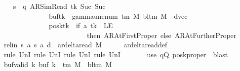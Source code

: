 \begin{isabellebody}
\ \ \isamarkupfalse%
\ {\isacharquery}{\kern0pt}s{\isacharprime}{\kern0pt}\ {\isacharequal}{\kern0pt}\ {\isachardoublequoteopen}{\isacharparenleft}{\kern0pt}q{\isacharcomma}{\kern0pt}\ AR{\isacharunderscore}{\kern0pt}SimRead{\isacharcomma}{\kern0pt}\ tk{\isacharcomma}{\kern0pt}\ Suc\ {\isacharparenleft}{\kern0pt}Suc\ {}{\isacharparenright}{\kern0pt}{\isacharcomma}{\kern0pt}\isanewline
\ \ \ \ \ \ \ \ \ \ \ \ \ \ buf{\isacharparenleft}{\kern0pt}tk\ {\isacharcolon}{\kern0pt}{\isacharequal}{\kern0pt}\ gamma{\isacharunderscore}{\kern0pt}unenum\ {\isacharparenleft}{\kern0pt}{\isasymGamma}{\isacharunderscore}{\kern0pt}tm\ M{\isacharparenright}{\kern0pt}\ {\isacharparenleft}{\kern0pt}bl{\isacharunderscore}{\kern0pt}tm\ M{\isacharparenright}{\kern0pt}\ {}{\isacharparenright}{\kern0pt}{\isacharcomma}{\kern0pt}\ dvec{\isacharcomma}{\kern0pt}\isanewline
\ \ \ \ \ \ \ \ \ \ \ \ \ \ posk{\isacharparenleft}{\kern0pt}tk\ {\isacharcolon}{\kern0pt}{\isacharequal}{\kern0pt}\ if\ {\isacharquery}{\kern0pt}a\ tk\ {\isacharequal}{\kern0pt}\ LE{}\isanewline
\ \ \ \ \ \ \ \ \ \ \ \ \ \ \ \ \ \ \ \ \ \ \ \ \ then\ AR{\isacharunderscore}{\kern0pt}AtFirstProper\ else\ AR{\isacharunderscore}{\kern0pt}AtFurtherProper{\isacharparenright}{\kern0pt}{\isacharparenright}{\kern0pt}{\isachardoublequoteclose}\isanewline
\ \ \isamarkupfalse%
\ rel{\isacharunderscore}{\kern0pt}in{\isacharcolon}{\kern0pt}\ {\isachardoublequoteopen}{\isacharparenleft}{\kern0pt}{\isacharquery}{\kern0pt}s{\isacharcomma}{\kern0pt}\ {\isacharquery}{\kern0pt}a{\isacharcomma}{\kern0pt}\ {\isacharquery}{\kern0pt}s{\isacharprime}{\kern0pt}{\isacharcomma}{\kern0pt}\ {\isacharquery}{\kern0pt}a{\isacharcomma}{\kern0pt}\ {\isacharquery}{\kern0pt}d{\isacharparenright}{\kern0pt}\ {\isasymin}\ ar{\isacharunderscore}{\kern0pt}delta{\isacharunderscore}{\kern0pt}read\ M{\isachardoublequoteclose}\isanewline
\ \ \ \ \isamarkupfalse%
\ ar{\isacharunderscore}{\kern0pt}delta{\isacharunderscore}{\kern0pt}read{\isacharunderscore}{\kern0pt}def\isanewline
\ \ \ \ \isamarkupfalse%
\ {\isacharparenleft}{\kern0pt}rule\ UnI{}{\isacharcomma}{\kern0pt}\ rule\ UnI{}{\isacharcomma}{\kern0pt}\ rule\ UnI{}{\isacharcomma}{\kern0pt}\ rule\ UnI{}{\isacharparenright}{\kern0pt}\isanewline
\ \ \ \ \ \ \ {\isacharparenleft}{\kern0pt}use\ qQ\ posk{\isacharunderscore}{\kern0pt}proper\ \ blast{\isacharparenright}{\kern0pt}\isanewline
\ \ \isamarkupfalse%
\ buf{\isacharunderscore}{\kern0pt}valid{\isacharcolon}{\kern0pt}\ {\isachardoublequoteopen}{\isasymforall}k{\isachardot}{\kern0pt}\ buf\ k\ {\isasymin}\ {\isasymGamma}{\isacharunderscore}{\kern0pt}tm\ M\ {\isasymunion}\ {\isacharbraceleft}{\kern0pt}bl{\isacharunderscore}{\kern0pt}tm\ M{\isacharbraceright}{\kern0pt}{\isachardoublequoteclose}\isanewline

\end{isabellebody}
